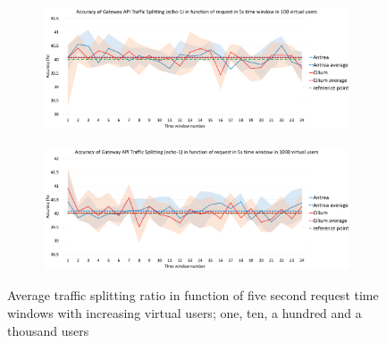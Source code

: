\begin{figure}[H]
    \begin{subfigure}[b]{0.85\textwidth}
        \includegraphics[width=\textwidth]{plots/traffic-splitting/time_window_5_100vu_cloud.png}
        \label{fig:time_window_100vu}
    \end{subfigure}

    \vspace{-0.5cm}

    \begin{subfigure}[b]{0.85\textwidth}
        \includegraphics[width=\textwidth]{plots/traffic-splitting/time_window_5_1000vu_cloud.png}
        \label{fig:time_window_1000vu}
    \end{subfigure}

    \vspace{-0.3cm}

    \caption{Average traffic splitting ratio in function of five second request time windows with increasing virtual users; one, ten, a hundred and a thousand users}
    \label{fig:avg_vus}
\end{figure}



